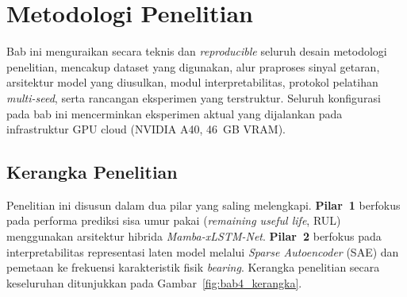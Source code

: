 ﻿%

\chapter{Metodologi Penelitian}
\label{bab:metodologi}

Bab ini menguraikan secara teknis dan \emph{reproducible} seluruh
desain metodologi penelitian, mencakup dataset yang digunakan, alur
praproses sinyal getaran, arsitektur model yang diusulkan, modul
interpretabilitas, protokol pelatihan \emph{multi-seed}, serta rancangan
eksperimen yang terstruktur.
Seluruh konfigurasi pada bab ini mencerminkan eksperimen aktual yang
dijalankan pada infrastruktur GPU cloud (NVIDIA A40, 46~GB VRAM).

\section{Kerangka Penelitian}
\label{sec:bab4_kerangka}

Penelitian ini disusun dalam dua pilar yang saling melengkapi.
\textbf{Pilar~1} berfokus pada performa prediksi sisa umur pakai
(\emph{remaining useful life}, RUL) menggunakan arsitektur hibrida
\emph{Mamba-xLSTM-Net}.
\textbf{Pilar~2} berfokus pada interpretabilitas representasi laten model
melalui \emph{Sparse Autoencoder} (SAE) dan pemetaan ke frekuensi
karakteristik fisik \emph{bearing}.
Kerangka penelitian secara keseluruhan ditunjukkan pada
Gambar~\ref{fig:bab4_kerangka}.

